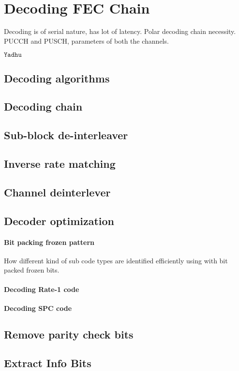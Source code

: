 \chapter{Decoding FEC Chain} \label{chap:decoder}


Decoding is of serial nature, has lot of latency. Polar decoding chain necessity. PUCCH and PUSCH, parameters of both the channels.

$\mathtt{Yadhu}$

\section{Decoding algorithms}

\section{Decoding chain}

\section{Sub-block de-interleaver}

\section{Inverse rate matching}

\section{Channel deinterlever}

\section{Decoder optimization}

\subsubsection{Bit packing frozen pattern}
How different kind of sub code types are identified efficiently using with bit packed frozen bits.

\subsubsection{Decoding Rate-1 code}

\subsubsection{Decoding SPC code}

\section{Remove parity check bits}

\section{Extract Info Bits}

